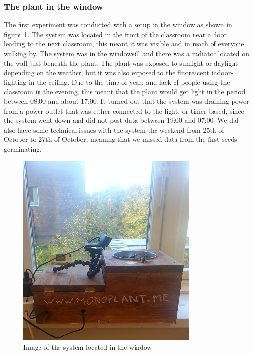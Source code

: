 \subsubsection*{The plant in the window}
The first experiment was conducted with a setup in the window as shown in figure~\ref{fig:windowplant}. The system was located in the front of the classroom near a door leading to the next classroom, this meant it was visible and in reach of everyone walking by. The system was in the windowsill and there was a radiator located on the wall just beneath the plant. The plant was exposed to sunlight or daylight depending on the weather, but it was also exposed to the fluorescent indoor-lighting in the ceiling. Due to the time of year, and lack of people using the classroom in the evening, this meant that the plant would get light in the period between 08:00 and about 17:00. It turned out that the system was draining power from a power outlet that was either connected to the light, or timer based, since the system went down and did not post data between 19:00 and 07:00. We did also have some technical issues with the system the weekend from 25th of October to 27th of October, meaning that we missed data from the first seeds germinating.

\begin{figure}
\centering
\includegraphics[width=0.8\textwidth]{img/empiricalsetting/window.jpg}
\caption{Image of the system located in the window}
\label{fig:windowplant}
\end{figure}



